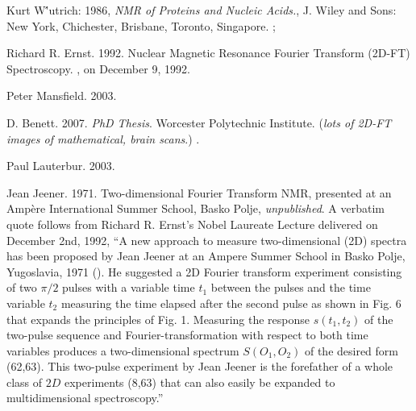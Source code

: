 \documentclass[12pt]{article}
\theoremstyle{plain}
\theoremstyle{definition}
\numberwithin{equation}{section}
\begin{document}
\begin{thebibliography}{9}

Kurt W\''{u}trich:  1986, \emph{NMR of Proteins and Nucleic Acids.}, J. Wiley and Sons:
New York, Chichester, Brisbane, Toronto, Singapore. 
;

Richard R. Ernst. 1992. Nuclear Magnetic Resonance Fourier Transform (2D-FT) Spectroscopy.
, on December 9, 1992.

Peter Mansfield. 2003. 

D. Benett. 2007. \emph{PhD Thesis}. Worcester Polytechnic Institute. ({\em lots of 2D-FT images of mathematical, brain scans}.)
. 

Paul Lauterbur. 2003. 

Jean Jeener. 1971. Two-dimensional Fourier Transform NMR, presented at an Amp\`ere International Summer School, Basko Polje, \emph{unpublished}. A verbatim quote follows from Richard R. Ernst's Nobel Laureate Lecture
delivered on December 2nd, 1992, ``A new approach to measure two-dimensional (2D) spectra has been
proposed by Jean Jeener at an Ampere Summer School in Basko Polje, Yugoslavia, 1971 (\cite{JeanJeneer1971}). He suggested a 2D Fourier transform experiment consisting of two $\pi/2$ pulses with a variable time $t_1$ between the pulses and the time variable $t_2$ measuring the time elapsed after the second pulse as shown in Fig. 6 that expands the principles of Fig. 1. Measuring the response $s(t_1,t_2)$ of the two-pulse sequence and Fourier-transformation with
respect to both time variables produces a two-dimensional spectrum $S(O_1,O_2)$ of the desired form (62,63). This two-pulse experiment by Jean Jeener is the forefather of a whole class of $2D$ experiments (8,63) 
that can also easily be expanded to multidimensional spectroscopy.''

\end{thebibliography}

\end{document}
